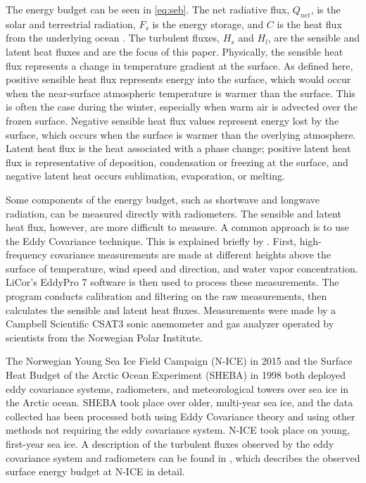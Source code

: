 The energy budget can be seen in \ref{eq:seb}. The net radiative flux, $Q_{net}$, is the solar and terrestrial radiation, $F_{s}$ is the energy storage, and $C$ is the heat flux from the underlying ocean \citep{walden:2017}. The turbulent fluxes, $H_{s}$ and $H_{l}$, are the sensible and latent heat fluxes and are the focus of this paper. Physically, the sensible heat flux represents a change in temperature gradient at the surface. As defined here, positive sensible heat flux represents energy into the surface, which would occur when the near-surface atmospheric temperature is warmer than the surface. This is often the case during the winter, especially when warm air is advected over the frozen surface. Negative sensible heat flux values represent energy lost by the surface, which occurs when the surface is warmer than the overlying atmosphere. Latent heat flux is the heat associated with a phase change; positive latent heat flux is representative of deposition, condensation or freezing at the surface, and negative latent heat occurs sublimation, evaporation, or melting.

Some components of the energy budget, such as shortwave and longwave radiation, can be measured directly with radiometers. The sensible and latent heat flux, however, are more difficult to measure. A common approach is to use the Eddy Covariance technique. This is explained briefly by \citet{walden:2017}. First, high-frequency covariance measurements are made at different heights above the surface of temperature, wind speed and direction, and water vapor concentration. LiCor's EddyPro 7 \citep{epro} software is then used to process these measurements. The program conducts calibration and filtering on the raw measurements, then calculates the sensible and latent heat fluxes. Measurements were made by a Campbell Scientific CSAT3 sonic anemometer and gas analyzer operated by scientists from the Norwegian Polar Institute. 

The Norwegian Young Sea Ice Field Campaign (N-ICE) in 2015 and the Surface Heat Budget of the Arctic Ocean Experiment (SHEBA) in 1998 both deployed eddy covariance systems, radiometers, and meteorological towers over sea ice in the Arctic ocean. SHEBA took place over older, multi-year sea ice, and the data collected has been processed both using Eddy Covariance theory and using other methods not requiring the eddy covariance system. N-ICE took place on young, first-year sea ice. A description of the turbulent fluxes observed by the eddy covariance system and radiometers can be found in \citet{walden:2017}, which describes the observed surface energy budget at N-ICE in detail. 

